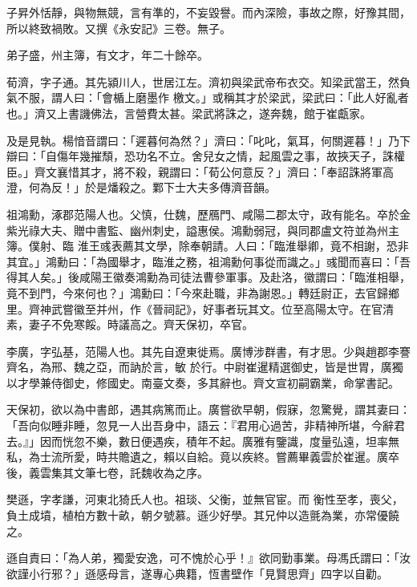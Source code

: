 \begin{pinyinscope}
 子昇外恬靜，與物無競，言有準的，不妄毀譽。而內深險，事故之際，好豫其間，所以終致禍敗。又撰《永安記》三卷。無子。



 弟子盛，州主簿，有文才，年二十餘卒。



 荀濟，字子通。其先潁川人，世居江左。濟初與梁武帝布衣交。知梁武當王，然負氣不服，謂人曰：「會楯上磨墨作
 檄文。」或稱其才於梁武，梁武曰：「此人好亂者也。」濟又上書譏佛法，言營費太甚。梁武將誅之，遂奔魏，館于崔甗家。



 及是見執。楊愔音謂曰：「遲暮何為然？」濟曰：「叱叱，氣耳，何關遲暮！」乃下辯曰：「自傷年幾摧頹，恐功名不立。舍兒女之情，起風雲之事，故挾天子，誅權臣。」齊文襄惜其才，將不殺，親謂曰：「荀公何意反？」濟曰：「奉詔誅將軍高澄，何為反！」於是燔殺之。鄴下士大夫多傳濟音韻。



 祖鴻勳，涿郡范陽人也。父慎，仕魏，歷鴈門、咸陽二郡太守，政有能名。卒於金紫光祿大夫、贈中書監、幽州刺史，謚惠侯。鴻勳弱冠，與同郡盧文符並為州主簿。僕射、臨
 淮王彧表薦其文學，除奉朝請。人曰：「臨淮舉卿，竟不相謝，恐非其宜。」鴻勳曰：「為國舉才，臨淮之務，祖鴻勳何事從而識之。」彧聞而喜曰：「吾得其人矣。」後咸陽王徽奏鴻勳為司徒法曹參軍事。及赴洛，徽謂曰：「臨淮相舉，竟不到門，今來何也？」鴻勳曰：「今來赴職，非為謝恩。」轉廷尉正，去官歸鄉里。齊神武嘗徽至并州，作《晉祠記》，好事者玩其文。位至高陽太守。在官清素，妻子不免寒餒。時議高之。齊天保初，卒官。



 李廣，字弘基，范陽人也。其先自遼東徙焉。廣博涉群書，有才思。少與趙郡李謇齊名，為邢、魏之亞，而訥於言，敏
 於行。中尉崔暹精選御史，皆是世胃，廣獨以才學兼侍御史，修國史。南臺文奏，多其辭也。齊文宣初嗣霸業，命掌書記。



 天保初，欲以為中書郎，遇其病篤而止。廣嘗欲早朝，假寐，忽驚覺，謂其妻曰：「吾向似睡非睡，忽見一人出吾身中，語云：『君用心過苦，非精神所堪，今辭君去。』」因而恍忽不樂，數日便遇疾，積年不起。廣雅有鑒識，度量弘遠，坦率無私，為士流所愛，時共贍遺之，賴以自給。竟以疾終。嘗薦畢義雲於崔暹。廣卒後，義雲集其文筆七卷，託魏收為之序。



 樊遜，字孝謙，河東北猗氏人也。祖琰、父衡，並無官宦。而
 衡性至孝，喪父，負土成墳，植柏方數十畝，朝夕號慕。遜少好學。其兄仲以造氈為業，亦常優饒之。



 遜自責曰：「為人弟，獨愛安逸，可不愧於心乎！』欲同勤事業。母馮氏謂曰：「汝欲謹小行邪？」遜感母言，遂專心典籍，恆書壁作「見賢思齊」四字以自勸。




\end{pinyinscope}
